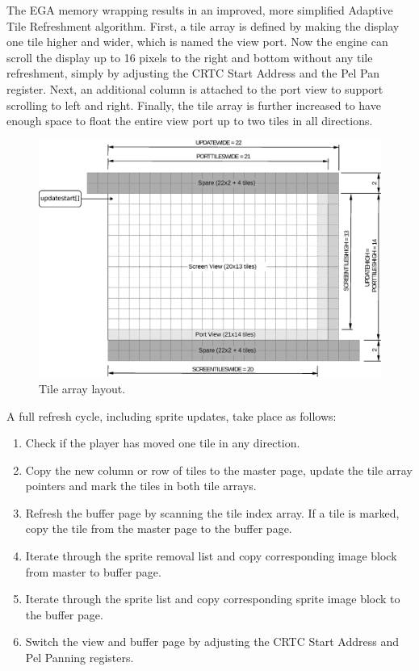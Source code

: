 \documentclass[book.tex]{subfiles}
\begin{document}
The EGA memory wrapping results in an improved, more simplified Adaptive Tile Refreshment algorithm. First, a tile array is defined by making the display one tile higher and wider, which is named the view port. Now the engine can scroll the display up to 16 pixels to the right and bottom without any tile refreshment, simply by adjusting the CRTC Start Address and the Pel Pan register. Next, an additional column is attached to the port view to support scrolling to left and right. Finally, the tile array is further increased to have enough space to float the entire view port up to two tiles in all directions.\\

\begin{figure}[H]
\centering
\includegraphics[width=\textwidth]{imgs/drawings/buffer_tile_layout.eps}
\caption{Tile array layout.}
\label{fig:screen_setup}
\end{figure}


\par
A full refresh cycle, including sprite updates, take place as follows:
\begin{enumerate}
  \item Check if the player has moved one tile in any direction.
  \item Copy the new column or row of tiles to the master page, update the tile array pointers and mark the tiles in both tile arrays. 
  \item Refresh the buffer page by scanning the tile index array. If a tile is marked, copy the tile from the master page to the buffer page.
  \item Iterate through the sprite removal list and copy corresponding image block from master  to buffer page. 
  \item Iterate through the sprite list and copy corresponding sprite image block to the buffer page.
  \item Switch the view and buffer page by adjusting the CRTC Start Address and Pel Panning registers.
\end{enumerate}
\end{document}
